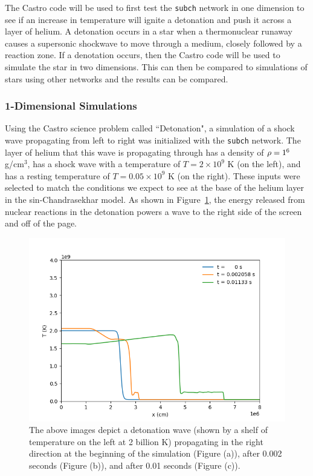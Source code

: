 \documentclass[preprint]{aastex62}
\begin{document}
    The Castro code will be used to first test the {\tt subch} network in one dimension to see if an increase in temperature will ignite a detonation and push it across a layer of helium. A detonation occurs in a star when a thermonuclear runaway causes a supersonic shockwave to move through a medium, closely followed by a reaction zone. If a denotation occurs, then the Castro code will be used to simulate the star in two dimensions. This can then be compared to simulations of stars using other networks and the results can be compared. 
    
    \newpage
    
    \subsubsection{1-Dimensional Simulations}
    
      Using the Castro science problem called ``Detonation", a simulation of a shock wave propagating from left to right was initialized with the {\tt subch} network. The layer of helium that this wave is propagating through has a density of $\rho = 1 \time 10^6$ g/cm$^3$, has a shock wave with a temperature of $T = 2 \times 10^9$ K (on the left), and has a resting temperature of $T = 0.05 \times 10^9$ K (on the right). These inputs were selected to match the conditions we expect to see at the base of the helium layer in the sin-Chandrasekhar model. As shown in Figure~\ref{fig:detonation}, the energy released from nuclear reactions in the detonation powers a wave to the right side of the screen and off of the page. 
      
    \begin{figure}
      \centering
      \includegraphics[width=5in]{images/flame-thesis}
      \caption{The above images depict a detonation wave (shown by a shelf of temperature on the left at 2 billion K) propagating in the right direction at the beginning of the simulation (Figure (a)), after 0.002 seconds (Figure (b)), and after 0.01 seconds (Figure (c)).}
      \label{fig:detonation}
    \end{figure}
      
\end{document}
